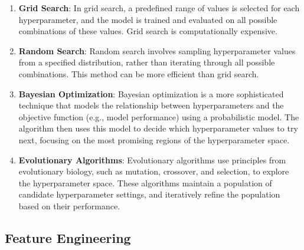 \documentclass[12pt]{article}
\begin{document}
\begin{enumerate}
\item \textbf{Grid Search}: In grid search, a predefined range of values is selected for each hyperparameter, and the model is trained and evaluated on all possible combinations of these values. Grid search is computationally expensive.

\item \textbf{Random Search}: Random search involves sampling hyperparameter values from a specified distribution, rather than iterating through all possible combinations. This method can be more efficient than grid search.

\item \textbf{Bayesian Optimization}: Bayesian optimization is a more sophisticated technique that models the relationship between hyperparameters and the objective function (e.g., model performance) using a probabilistic model. The algorithm then uses this model to decide which hyperparameter values to try next, focusing on the most promising regions of the hyperparameter space.

\item \textbf{Evolutionary Algorithms}: Evolutionary algorithms use principles from evolutionary biology, such as mutation, crossover, and selection, to explore the hyperparameter space. These algorithms maintain a population of candidate hyperparameter settings, and iteratively refine the population based on their performance.
\end{enumerate}

\subsection{Feature Engineering}
\end{document}
